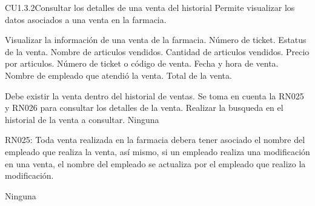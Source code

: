 \begin{UseCase} {CU1.3.2}{Consultar los detalles de una venta del historial}{
	Permite visualizar los datos asociados a una venta en la farmacia.
}








	
	{
	}
	{
		Visualizar la información de una venta de la farmacia.
	}
	{
		\UCli Número de ticket.
	}
	{
		\UCli Estatus de la venta.
		\UCli Nombre de articulos vendidos.
		\UCli Cantidad de articulos vendidos.
		\UCli Precio por articulos.
		\UCli Número de ticket o código de venta.
		\UCli Fecha y hora de venta.
		\UCli Nombre de empleado que atendió la venta.
		\UCli Total de la venta.
	}

	{
		\UCli Debe existir la venta dentro del historial de ventas.
		\UCli Se toma en cuenta la RN025 y RN026 para consultar los detalles de la venta.
		\UCli Realizar la busqueda en el historial de la venta a consultar.
	}
	{
		Ninguna
	}
	{
		\UCli RN025: Toda venta realizada en la farmacia debera tener asociado el nombre del empleado que realiza la venta, así mismo, si un empleado realiza una modificación en una venta, el nombre del empleado se actualiza por el empleado que realizo la modificación.
		
	}
	{
		Ninguna
	}
\end{UseCase}

